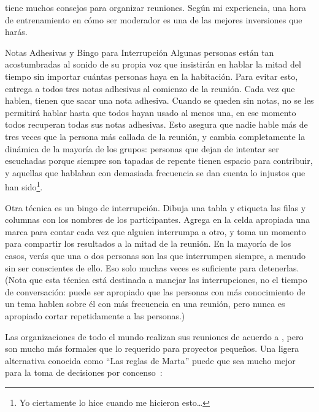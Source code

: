 \cite{Brow2007,Broo2016,Roge2018} tiene muchos consejos para organizar reuniones.
Según mi experiencia,
una hora de entrenamiento en cómo ser moderador
es una de las mejores inversiones que harás.

\begin{aside}{Notas Adhesivas y Bingo para Interrupción}
  Algunas personas están tan acostumbradas al sonido de su propia voz
  que insistirán en hablar la mitad del tiempo
  sin importar cuántas personas haya en la habitación.
  Para evitar esto,
  entrega a todos tres notas adhesivas al comienzo de la reunión.
  Cada vez que hablen,
  tienen que sacar una nota adhesiva.
  Cuando se queden sin notas,
  no se les permitirá hablar hasta que todos hayan usado al menos una,
  en ese momento todos recuperan todas sus notas adhesivas.
  Esto asegura que nadie hable más de tres veces que
  la persona más callada de la reunión,
  y cambia completamente la dinámica de la mayoría de los grupos:
  personas que dejan de intentar ser escuchadas porque siempre son tapadas
  de repente tienen espacio para contribuir,
  y aquellas que hablaban con demasiada frecuencia se dan cuenta lo injustos que han sido\footnote{
    Yo ciertamente lo hice cuando me hicieron esto{\ldots}
  }.

  Otra técnica es un bingo de interrupción.
  Dibuja una tabla y etiqueta las filas y columnas con los nombres de los participantes.
  Agrega en la celda apropiada una marca para contar 
  cada vez que alguien interrumpa a otro,
  y toma un momento para compartir los resultados a la mitad de la reunión.
  En la mayoría de los casos,
  verás que una o dos personas son las que interrumpen siempre,
  a menudo sin ser conscientes de ello.
  Eso solo muchas veces es suficiente  para detenerlas.
  (Nota que esta técnica está destinada a manejar las interrupciones,
  no el tiempo de conversación:
  puede ser apropiado que las personas con más conocimiento de un tema hablen sobre él con más frecuencia en una reunión,
  pero nunca es apropiado cortar repetidamente a las personas.)
\end{aside}


Las organizaciones de todo el mundo realizan sus reuniones de acuerdo a 
,
pero son mucho más formales que lo requerido para proyectos pequeños.
Una ligera alternativa conocida como ``Las reglas de Marta''
puede que sea mucho mejor para la toma de decisiones por concenso~\cite{Mina1986}:

